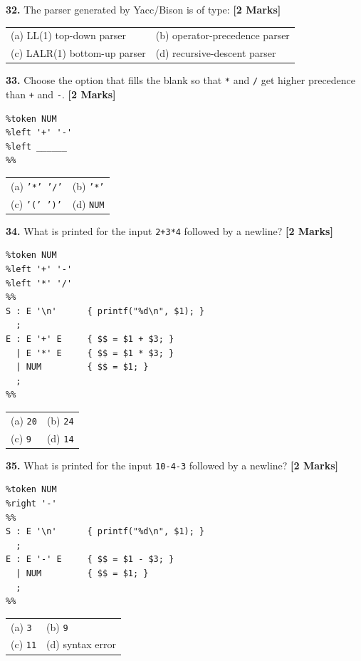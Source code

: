 \documentclass[11pt,a4paper]{article}
\begin{document}
\vspace{0.22cm}

\noindent \textbf{32.} The parser generated by Yacc/Bison is of type: \hfill \textbf{[2 Marks]}
\vspace{0.06cm}
\noindent
\begin{tabularx}{\textwidth}{@{}X X@{}}
(a) LL(1) top-down parser & (b) operator-precedence parser \\[3pt]
(c) LALR(1) bottom-up parser & (d) recursive-descent parser \\
\end{tabularx}

\vspace{0.22cm}

\noindent \textbf{33.} Choose the option that fills the blank so that \texttt{*} and \texttt{/} get higher precedence than \texttt{+} and \texttt{-}. \hfill \textbf{[2 Marks]}
\begin{lstlisting}
%token NUM
%left '+' '-'
%left ______
%%
\end{lstlisting}
\vspace{0.06cm}
\noindent
\begin{tabularx}{\textwidth}{@{}X X@{}}
(a) \texttt{'*' '/'} & (b) \texttt{'*'} \\[3pt]
(c) \texttt{'(' ')'} & (d) \texttt{NUM} \\
\end{tabularx}

\vspace{0.22cm}

\noindent \textbf{34.} What is printed for the input \texttt{2+3*4} followed by a newline? \hfill \textbf{[2 Marks]}
\begin{lstlisting}
%token NUM
%left '+' '-'
%left '*' '/'
%%
S : E '\n'      { printf("%d\n", $1); }
  ;
E : E '+' E     { $$ = $1 + $3; }
  | E '*' E     { $$ = $1 * $3; }
  | NUM         { $$ = $1; }
  ;
%%
\end{lstlisting}
\vspace{0.06cm}
\noindent
\begin{tabularx}{\textwidth}{@{}X X@{}}
(a) \texttt{20} & (b) \texttt{24} \\[3pt]
(c) \texttt{9} & (d) \texttt{14} \\
\end{tabularx}

\vspace{0.22cm}

\noindent \textbf{35.} What is printed for the input \texttt{10-4-3} followed by a newline? \hfill \textbf{[2 Marks]}
\begin{lstlisting}
%token NUM
%right '-'
%%
S : E '\n'      { printf("%d\n", $1); }
  ;
E : E '-' E     { $$ = $1 - $3; }
  | NUM         { $$ = $1; }
  ;
%%
\end{lstlisting}
\vspace{0.06cm}
\noindent
\begin{tabularx}{\textwidth}{@{}X X@{}}
(a) \texttt{3} & (b) \texttt{9} \\[3pt]
(c) \texttt{11} & (d) syntax error \\
\end{tabularx}
\end{document}
